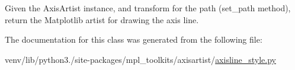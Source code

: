 \begin{DoxyVerb}Given the AxisArtist instance, and transform for the path (set_path
method), return the Matplotlib artist for drawing the axis line.
\end{DoxyVerb}
 

The documentation for this class was generated from the following file\+:\begin{DoxyCompactItemize}
\item 
venv/lib/python3./site-\/packages/mpl\+\_\+toolkits/axisartist/\hyperlink{axisartist_2axisline__style_8py}{axisline\+\_\+style.\+py}\end{DoxyCompactItemize}
